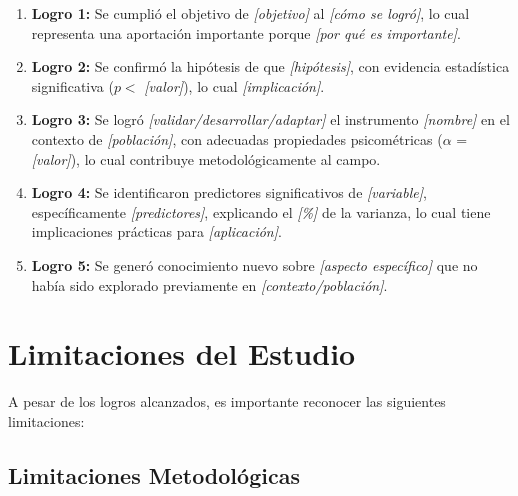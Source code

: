 \begin{enumerate}
    \item \textbf{Logro 1:} Se cumplió el objetivo de \textit{{[objetivo]}} al \textit{{[cómo se logró]}}, lo cual representa una aportación importante porque \textit{{[por qué es importante]}}.
    
    \item \textbf{Logro 2:} Se confirmó la hipótesis de que \textit{{[hipótesis]}}, con evidencia estadística significativa ($p < $ \textit{{[valor]}}), lo cual \textit{{[implicación]}}.
    
    \item \textbf{Logro 3:} Se logró \textit{{[validar/desarrollar/adaptar]}} el instrumento \textit{{[nombre]}} en el contexto de \textit{{[población]}}, con adecuadas propiedades psicométricas ($\alpha$ = \textit{{[valor]}}), lo cual contribuye metodológicamente al campo.
    
    \item \textbf{Logro 4:} Se identificaron predictores significativos de \textit{{[variable]}}, específicamente \textit{{[predictores]}}, explicando el \textit{[\%]} de la varianza, lo cual tiene implicaciones prácticas para \textit{{[aplicación]}}.
    
    \item \textbf{Logro 5:} Se generó conocimiento nuevo sobre \textit{{[aspecto específico]}} que no había sido explorado previamente en \textit{{[contexto/población]}}.
\end{enumerate}

\section{Limitaciones del Estudio}
\label{sec:limitaciones}


A pesar de los logros alcanzados, es importante reconocer las siguientes limitaciones:

\subsection{Limitaciones Metodológicas}
\label{subsec:limitaciones_metodologicas}

